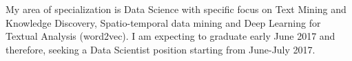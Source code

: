 
My area of specialization is Data Science with specific focus 
on Text Mining and Knowledge Discovery, Spatio-temporal data mining and Deep Learning for Textual Analysis (word2vec).
I am expecting to graduate early June 2017 and therefore, seeking a Data Scientist position 
starting from June-July 2017. 
